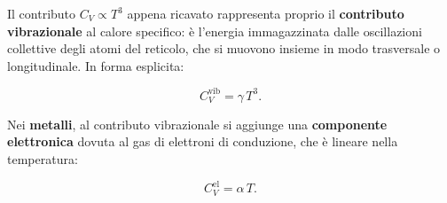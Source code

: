 Il contributo \( C_V \propto T^{3} \) appena ricavato rappresenta proprio il \textbf{contributo vibrazionale} al calore specifico: è l'energia immagazzinata dalle oscillazioni collettive degli atomi del reticolo, che si muovono insieme in modo trasversale o longitudinale. In forma esplicita:

\begin{equation}
    C_V^{\text{vib}} = \gamma \, T^{3}.
\end{equation}

Nei \textbf{metalli}, al contributo vibrazionale si aggiunge una \textbf{componente elettronica} dovuta al gas di elettroni di conduzione, che è lineare nella temperatura:

\begin{equation}
    C_V^{\text{el}} = \alpha \, T.
\end{equation}

